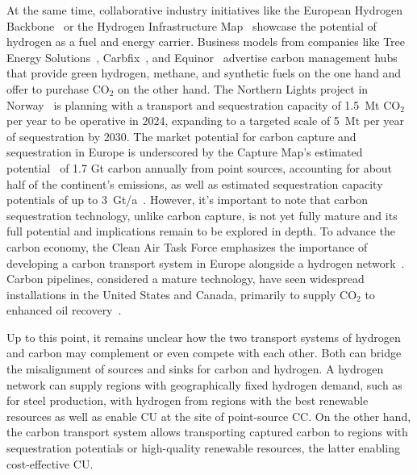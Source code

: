 \documentclass[twocolumn]{article}
\newcommand{\carbon}{CO$_2$}
\begin{document}
At the same time, collaborative industry initiatives like the European Hydrogen Backbone~\cite{gasforclimateEuropeanHydrogenBackbone2022} or the Hydrogen Infrastructure Map~\cite{H2InfrastructureMap} showcase the potential of hydrogen as a fuel and energy carrier.
Business models from companies like Tree Energy Solutions~\cite{TESHydrogenLife2023}, Carbfix~\cite{WeTurnCO2}, and Equinor~\cite{adomaitisEquinorRWEBuild2023} advertise carbon management hubs that provide green hydrogen, methane, and synthetic fuels on the one hand and offer to purchase \carbon{} on the other hand. The Northern Lights project in Norway~\cite{NorthernLightsWhat} is planning with a transport and sequestration capacity of 1.5~Mt \carbon{} per year to be operative in 2024, expanding to a targeted scale of 5~Mt per year of sequestration by 2030.
The market potential for carbon capture and sequestration in Europe is underscored by the Capture Map's estimated potential~\cite{ToolsGreenTransition} of 1.7 Gt carbon annually from point sources, accounting for about half of the continent's emissions, as well as estimated sequestration capacity potentials of up to 3~Gt/a~\cite{europeancommissionEuropeanCO2Storage}. However, it's important to note that carbon sequestration technology, unlike carbon capture, is not yet fully mature and its full potential and implications remain to be explored in depth.
To advance the carbon economy, the Clean Air Task Force emphasizes the importance of developing a carbon transport system in Europe alongside a hydrogen network~\cite{lockwoodEuropeanStrategyCarbon}. Carbon pipelines, considered a mature technology, have seen widespread installations in the United States and Canada, primarily to supply \carbon{} to enhanced oil recovery~\cite{righettiSitingCarbonDioxide2017,friedmannNETZEROGEOSPHERICRETURN}.

Up to this point, it remains unclear how the two transport systems of hydrogen and carbon may complement or even compete with each other. Both can bridge the misalignment of sources and sinks for carbon and hydrogen. A hydrogen network can supply regions with geographically fixed hydrogen demand, such as for steel production, with hydrogen from regions with the best renewable resources as well as enable CU at the site of point-source CC. On the other hand, the carbon transport system allows transporting captured carbon to regions with sequestration potentials or high-quality renewable resources, the latter enabling cost-effective CU.
\end{document}
